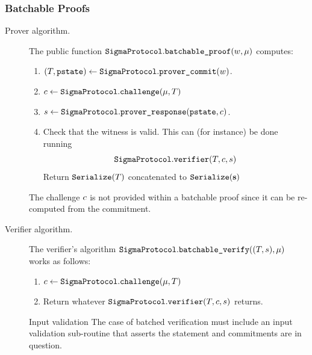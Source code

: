 \documentclass[11pt]{article}
\begin{document}
\subsubsection{Batchable Proofs}

\begin{description}
\item[Prover algorithm.]
The public function $\texttt{SigmaProtocol}.\texttt{batchable\_proof}( w, \mu)$ computes:
\begin{enumerate}
\item
   $(T,\texttt{pstate})\gets\texttt{SigmaProtocol}.\texttt{prover\_commit}( w)$.
\item
$c \gets \texttt{SigmaProtocol}.\texttt{challenge}(\mu,T)$
\item
   $s\gets\texttt{SigmaProtocol}.\texttt{prover\_response}(\texttt{pstate},  c)$.
   \item Check that the witness is valid. This can (for instance) be done running \[\texttt{SigmaProtocol}.\texttt{verifier}(T, c, s)\]
  Return $\texttt{Serialize}(T)$ concatenated to $\texttt{Serialize}(\mathbf {s})$
\end{enumerate}
The challenge $c$ is not provided within a batchable proof since it can be re-computed from the commitment.
\item[Verifier algorithm.] The verifier's algorithm $\texttt{SigmaProtocol}.\texttt{batchable\_verify}((T,s), \mu)$ works as follows:
\begin{enumerate}
  \item
    $c \gets \texttt{SigmaProtocol}.\texttt{challenge}(\mu, T)$
  \item
    Return whatever $\texttt{SigmaProtocol}.\texttt{verifier}(T,c, s)$ returns.
\end{enumerate}
\begin{warning}{Input validation}{}
The case of batched verification must include an input validation sub-routine that asserts the statement and commitments are in question.

\end{warning}
\end{description}
\end{document}
